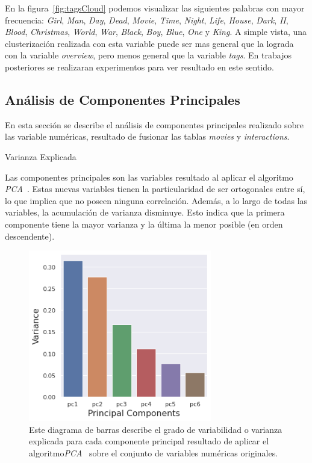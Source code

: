 \documentclass[11pt,a4paper,twoside]{thesis}
\begin{document}
En la figura~\ref{fig:tagsCloud} podemos visualizar las siguientes palabras con
mayor frecuencia: \textit{Girl}, \textit{Man}, \textit{Day}, \textit{Dead},
\textit{Movie}, \textit{Time}, \textit{Night}, \textit{Life}, \textit{House},
\textit{Dark}, \textit{II}, \textit{Blood}, \textit{Christmas}, \textit{World},
\textit{War}, \textit{Black}, \textit{Boy}, \textit{Blue}, \textit{One} y
\textit{King}. A simple vista, una clusterización realizada con esta variable
puede ser mas general que la lograda con la variable \textit{overview}, pero
menos general que la variable \textit{tags}. En trabajos posteriores se
realizaran experimentos para ver resultado en este sentido.

\clearpage

\subsection{Análisis de Componentes Principales}

En esta sección se describe el análisis de componentes principales realizado
sobre las variable numéricas, resultado de fusionar las tablas \textit{movies}
y \textit{interactions}.

\begin{description}
	\item[Varianza Explicada]
\end{description}

Las componentes principales son las variables resultado al aplicar el
algoritmo \textit{PCA}~\cite{pca}. Estas nuevas variables tienen la particularidad de ser
ortogonales entre sí, lo que implica que no poseen ninguna correlación. Además,
a lo largo de todas las variables, la acumulación de varianza disminuye. Esto
indica que la primera componente tiene la mayor varianza y la última la menor
posible (en orden descendente).

\begin{figure}[h!]
	\centering
	\includegraphics[width=8cm]{./images/PCA-Variance.png}
	\caption{Este diagrama de barras describe el grado de variabilidad o varianza explicada para cada componente principal resultado de aplicar el algoritmo\textit{PCA}~\cite{pca} sobre el conjunto de variables numéricas originales.}
	\label{fig:explainedVariancePlot}
\end{figure}
\end{document}
